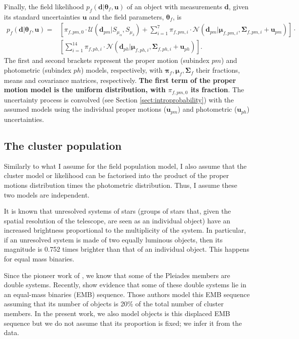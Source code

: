 Finally, the field likelihood $p_f(\mathbf{d}|\boldsymbol{\theta}_f,\mathbf{u})$ of an object with measurements $\mathbf{d}$, given its standard uncertainties $\mathbf{u}$ and the field parameters, $\boldsymbol{\theta}_f$, is
\begin{align}
p_f(\mathbf{d}|\boldsymbol{\theta}_f,\mathbf{u})=&\left[\pi_{f,pm,0}\cdot\mathcal{U}(\textbf{d}_{pm}|S_{\mu_{\alpha}},S_{\mu_{\delta}})+  \sum \limits_{i=1}^{7}\pi_{f,pm,i}\cdot \mathcal{N}(\mathbf{d}_{pm} | \boldsymbol{\mu}_{f,pm,i},\boldsymbol{\Sigma}_{f,pm,i}+\mathbf{u}_{pm})\right]\cdot  \nonumber \\ 
&\left[ \sum \limits_{i=1}^{14}\pi_{f,ph,i}\cdot \mathcal{N}(\mathbf{d}_{ph} | \boldsymbol{\mu}_{f,ph,i},\boldsymbol{\Sigma}_{f,ph,i}+\mathbf{u}_{ph})\right].
\label{eq:field}
\end{align}
The first and second brackets represent the proper motion (subindex $pm$) and photometric (subindex $ph$) models, respectively, with $\boldsymbol{\pi}_f,\boldsymbol{\mu}_f,\boldsymbol{\Sigma}_f$ their fractions, means and covariance matrices, respectively. \textbf{ The first term of the proper motion model is the uniform distribution, with $\pi_{f,pm,0}$ its fraction}. The uncertainty process is convolved (see Section \ref{sect:introprobability}) with the assumed models using the individual proper motions ($\mathbf{u}_{pm}$) and photometric ($\mathbf{u}_{ph}$) uncertainties. 

\subsection{The cluster population}
\label{subsect:cluster}
Similarly to what I assume for the field population model, I also assume that the cluster model or likelihood can be factorised into the product of the proper motions distribution times the photometric distribution. Thus, I assume these two models are independent. 

It is known that unresolved systems of stars (groups of stars that, given the spatial resolution of the telescope, are seen as an individual object) have an increased brightness proportional to the multiplicity of the system. In particular, if an unresolved system is made of two equally luminous objects, then its magnitude is 0.752 times brighter than that of an individual object. This happens for equal mass binaries.

Since the pioneer work of \citet{Trumpler1921}, we know that some of the Pleiades members are double systems. Recently, \citet{Sarro2014} show evidence that some of these double systems lie in an equal-mass binaries (EMB) sequence. Those authors model this EMB sequence assuming that its number of objects is 20\% of the total number of cluster members. In the present work, we also model objects is this displaced EMB sequence  but we do not assume that its proportion is fixed; we infer it from the data. 

